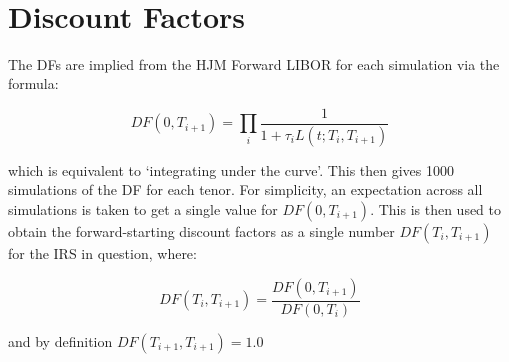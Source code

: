 \documentclass[reqno]{article}
\begin{document}
    \begin{center}
    \end{center}
    { \hspace*{\fill} \\}

    \section{Discount Factors}\label{discount-factors}

The DFs are implied from the HJM Forward LIBOR for each simulation via
the formula:

\begin{equation}
DF(0, T_{i+1}) = \prod_{i} \frac{1}{1 + \tau_i L(t; T_i, T_{i+1})}
\end{equation}

which is equivalent to `integrating under the curve'. This then gives
1000 simulations of the DF for each tenor. For simplicity, an
expectation across all simulations is taken to get a single value for
\(DF(0, T_{i+1})\). This is then used to obtain the forward-starting
discount factors as a single number \(DF(T_i, T_{i+1})\) for the IRS in question, where:

\begin{equation}
DF(T_i, T_{i+1}) = \frac{DF(0, T_{i+1})}{DF(0, T_i)}
\end{equation}

and by definition \(DF(T_{i+1}, T_{i+1}) = 1.0\)
\end{document}
